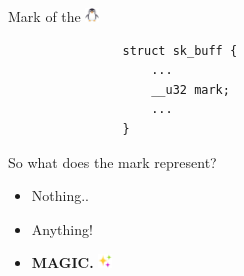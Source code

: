 \documentclass[black,white,aspectratio=169]{beamer}
\newcommand\blfootnote[1]{%
  \begingroup
  \renewcommand\thefootnote{}\footnote{#1}%
  \addtocounter{footnote}{-1}%
  \endgroup
}
\DeclareRobustCommand{\#}{\adjustbox{valign=B,totalheight=.57\baselineskip}{\oldhash}}%
\begin{document}
\begin{frame}[fragile]{Mark of the \includegraphics[height=1em]{penguin.png}}
\begin{table}
\begin{subtable}[l]{0.2\textwidth}
\begin{itemize}
                \end{itemize}
            \end{subtable}
            \begin{subtable}[r]{0.7\textwidth}
                \begin{lstlisting}
                struct sk_buff {
                    ...
                    __u32 mark;
                    ...
                }
                \end{lstlisting}
            \end{subtable}
        \end{table}
    \end{frame}

    \begin{frame}{So what does the mark represent?}
        \begin{itemize}
            \item Nothing.. \bigskip
            \pause
            \item Anything! \bigskip
            \pause
            \item \textbf{MAGIC.} \includegraphics[height=1em]{sparkles.png}\bigskip
        \end{itemize}
    \end{frame}
\end{document}
